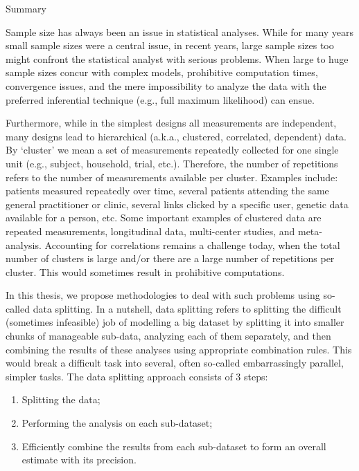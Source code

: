 \documentclass[14pt]{article}
\begin{document}
\begin{center}
{\Huge{Summary}}
\end{center}
\vspace{1cm}
Sample size has always been an issue in statistical analyses. While for many years small sample sizes were a central issue, in recent years, large sample sizes too might confront the statistical analyst with serious problems. When large to huge sample sizes concur with complex models, prohibitive computation times, convergence issues, and the mere impossibility to analyze the data with the preferred inferential technique (e.g., full maximum likelihood) can ensue. 

Furthermore, while in the simplest designs all measurements are independent, many designs lead to hierarchical (a.k.a., clustered, correlated, dependent) data. By `cluster' we mean a set of measurements repeatedly collected for one single unit (e.g., subject, household, trial, etc.). Therefore, the number of repetitions refers to the number of measurements available per cluster. Examples include: patients measured repeatedly over time, several patients attending the same general practitioner or clinic, several links clicked by a specific user, genetic data available for a person, etc. Some important examples of clustered data are repeated measurements, longitudinal data, multi-center studies, and meta-analysis. Accounting for correlations remains a challenge today, when the total number of clusters is large and/or there are a large number of repetitions per cluster. This would sometimes result in prohibitive computations. 

In this thesis, we propose methodologies to deal with such problems using  so-called data splitting. In a nutshell, data splitting refers to splitting the difficult (sometimes infeasible) job of modelling a big dataset by splitting it into smaller chunks of manageable sub-data, analyzing each of them separately, and then combining the results of these analyses using appropriate combination rules. This would break a difficult task into several, often so-called embarrassingly parallel, simpler tasks. The data splitting approach consists of 3 steps:
\begin{enumerate}
\item Splitting the data;
\item Performing the analysis on each sub-dataset;
\item Efficiently combine the results from each sub-dataset to form an overall estimate with its precision.
\end{enumerate}
\end{document}
